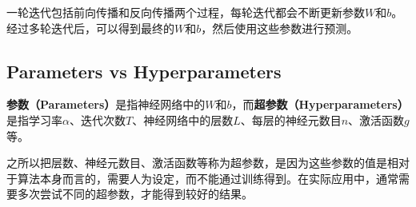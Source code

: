 一轮迭代包括前向传播和反向传播两个过程，每轮迭代都会不断更新参数$W$和$b$。经过多轮迭代后，可以得到最终的$W$和$b$，然后使用这些参数进行预测。

\subsection{Parameters vs Hyperparameters}
\textbf{参数（Parameters）}是指神经网络中的$W$和$b$，而\textbf{超参数（Hyperparameters）}是指学习率$\alpha$、迭代次数$T$、神经网络中的层数$L$、每层的神经元数目$n$、激活函数$g$等。

之所以把层数、神经元数目、激活函数等称为超参数，是因为这些参数的值是相对于算法本身而言的，需要人为设定，而不能通过训练得到。在实际应用中，通常需要多次尝试不同的超参数，才能得到较好的结果。
